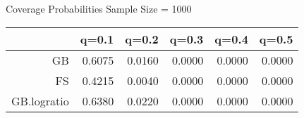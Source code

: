 

 Coverage Probabilities Sample Size =  1000 

\begin{tabular}{rrrrrr}
  \hline
 & q=0.1 & q=0.2 & q=0.3 & q=0.4 & q=0.5 \\ 
  \hline
GB & 0.6075 & 0.0160 & 0.0000 & 0.0000 & 0.0000 \\ 
  FS & 0.4215 & 0.0040 & 0.0000 & 0.0000 & 0.0000 \\ 
  GB.logratio & 0.6380 & 0.0220 & 0.0000 & 0.0000 & 0.0000 \\ 
   \hline
\end{tabular}
\vspace{0.2in}
